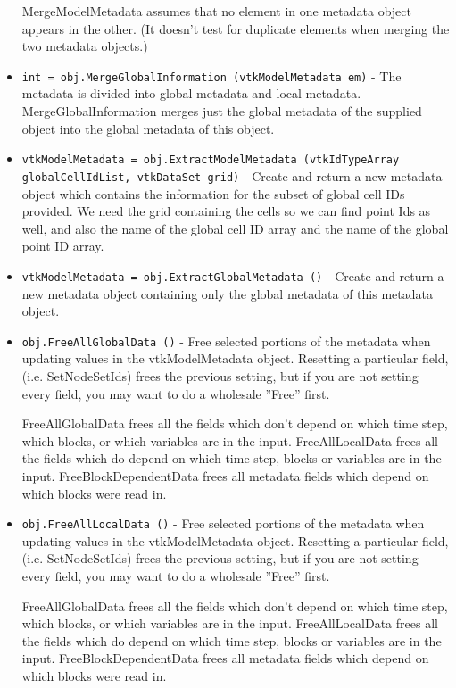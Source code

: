 \begin{itemize}
   MergeModelMetadata assumes that no element in one metadata
   object appears in the other.  (It doesn't test for duplicate
   elements when merging the two metadata objects.) 

\item  \verb|int = obj.MergeGlobalInformation (vtkModelMetadata em)| -    The metadata is divided into global metadata and local
   metadata.  MergeGlobalInformation merges just the
   global metadata of the supplied object into the
   global metadata of this object.

\item  \verb|vtkModelMetadata = obj.ExtractModelMetadata (vtkIdTypeArray globalCellIdList, vtkDataSet grid)| -    Create and return a new metadata object which contains
   the information for the subset of global cell IDs provided.
   We need the grid containing the cells so we can find point
   Ids as well, and also the name of the global cell ID array
   and the name of the global point ID array.

\item  \verb|vtkModelMetadata = obj.ExtractGlobalMetadata ()| -    Create and return a new metadata object containing only the
   global metadata of this metadata object.  

\item  \verb|obj.FreeAllGlobalData ()| -    Free selected portions of the metadata when updating values
   in the vtkModelMetadata object.  Resetting a particular field,
   (i.e. SetNodeSetIds) frees the previous setting, but if you
   are not setting every field, you may want to do a wholesale
   ''Free'' first.

   FreeAllGlobalData frees all the fields which don't depend on
     which time step, which blocks, or which variables are in the input.
   FreeAllLocalData frees all the fields which do depend on which
     time step, blocks or variables are in the input.
   FreeBlockDependentData frees all metadata fields which depend on
     which blocks were read in.

\item  \verb|obj.FreeAllLocalData ()| -    Free selected portions of the metadata when updating values
   in the vtkModelMetadata object.  Resetting a particular field,
   (i.e. SetNodeSetIds) frees the previous setting, but if you
   are not setting every field, you may want to do a wholesale
   ''Free'' first.

   FreeAllGlobalData frees all the fields which don't depend on
     which time step, which blocks, or which variables are in the input.
   FreeAllLocalData frees all the fields which do depend on which
     time step, blocks or variables are in the input.
   FreeBlockDependentData frees all metadata fields which depend on
     which blocks were read in.


\end{itemize}
